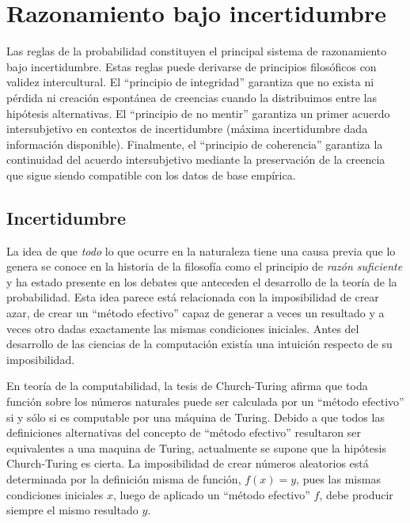 \documentclass[a4paper,11pt]{book}
\theoremstyle{definition}
\begin{document}
%

\section{Razonamiento bajo incertidumbre}\label{sec:principios_interculturales}

Las reglas de la probabilidad constituyen el principal sistema de razonamiento bajo incertidumbre.
%
Estas reglas puede derivarse de principios filos\'oficos con validez intercultural.
%
El ``principio de integridad'' garantiza que no exista ni p\'erdida ni creaci\'on espontánea de creencias cuando la distribuimos entre las hip\'otesis alternativas.
%
El ``principio de no mentir'' garantiza un primer acuerdo intersubjetivo en contextos de incertidumbre (máxima incertidumbre dada informaci\'on disponible).
%
Finalmente, el ``principio de coherencia'' garantiza la continuidad del acuerdo intersubjetivo mediante la preservaci\'on de la creencia que sigue siendo compatible con los datos de base emp\'irica.

\subsection{Incertidumbre}

La idea de que \emph{todo} lo que ocurre en la naturaleza tiene una causa previa que lo genera se conoce en la historia de la filosof\'ia como el principio de \emph{raz\'on suficiente} y ha estado presente en los debates que anteceden el desarrollo de la teoría de la probabilidad.
%
%
Esta idea parece está relacionada con la imposibilidad de crear azar, de crear un ``método efectivo'' capaz de generar a veces un resultado y a veces otro dadas exactamente las mismas condiciones iniciales.
%
Antes del desarrollo de las ciencias de la computación existía una intuición respecto de su imposibilidad.


En teor\'ia de la computabilidad, la tesis de Church-Turing afirma que toda funci\'on sobre los n\'umeros naturales puede ser calculada por un ``m\'etodo efectivo'' si y s\'olo si es computable por una m\'aquina de Turing.
%
Debido a que todos las definiciones alternativas del concepto de ``m\'etodo efectivo'' resultaron ser equivalentes a una maquina de Turing, actualmente se supone que la hip\'otesis Church-Turing es cierta.
%
La imposibilidad de crear números aleatorios está determinada por la definición misma de función, $f(x) = y$, pues las mismas condiciones iniciales $x$, luego de aplicado un ``método efectivo'' $f$, debe producir siempre el mismo resultado $y$.
\end{document}
